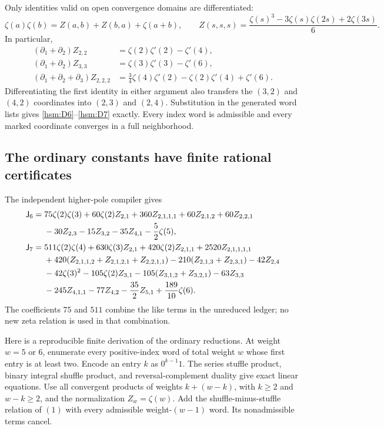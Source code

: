 Only identities valid on open convergence domains are differentiated:
\[
 \zeta(a)\zeta(b)=Z(a,b)+Z(b,a)+\zeta(a+b),\qquad
 Z(s,s,s)=\frac{\zeta(s)^3-3\zeta(s)\zeta(2s)+2\zeta(3s)}6.
\]
In particular,
\begin{align*}
 (\partial_1+\partial_2)Z_{2,2}
       &=\zeta(2)\zeta'(2)-\zeta'(4),\\
 (\partial_1+\partial_2)Z_{3,3}
       &=\zeta(3)\zeta'(3)-\zeta'(6),\\
 (\partial_1+\partial_2+\partial_3)Z_{2,2,2}
       &=\frac34\zeta(4)\zeta'(2)-\zeta(2)\zeta'(4)+\zeta'(6).
\end{align*}
Differentiating the first identity in either argument also transfers
the $(3,2)$ and $(4,2)$ coordinates into $(2,3)$ and $(2,4)$.
Substitution in the generated word lists gives
\eqref{hsm:D6}--\eqref{hsm:D7} exactly.  Every index word is
admissible and every marked coordinate converges in a full neighborhood.

\subsection{The ordinary constants have finite rational certificates}

The independent higher-pole compiler gives
\begin{align}\label{hsm:J6}
 \mathsf J_6={}&75\zeta(2)\zeta(3)+60\zeta(2)Z_{2,1}
       +360Z_{2,1,1,1}+60Z_{2,1,2}+60Z_{2,2,1}\notag\\
 &-30Z_{2,3}-15Z_{3,2}-35Z_{4,1}-\frac52\zeta(5),\\
 \mathsf J_7={}&511\zeta(2)\zeta(4)+630\zeta(3)Z_{2,1}
       +420\zeta(2)Z_{2,1,1}+2520Z_{2,1,1,1,1}\notag\\
 &+420(Z_{2,1,1,2}+Z_{2,1,2,1}+Z_{2,2,1,1})
       -210(Z_{2,1,3}+Z_{2,3,1})-42Z_{2,4}\notag\\
 &-42\zeta(3)^2-105\zeta(2)Z_{3,1}
       -105(Z_{3,1,2}+Z_{3,2,1})-63Z_{3,3}\notag\\
 &-245Z_{4,1,1}-77Z_{4,2}-\frac{35}{2}Z_{5,1}
       +\frac{189}{10}\zeta(6).
       \label{hsm:J7}
\end{align}
The coefficients $75$ and $511$ combine the like terms in the
unreduced ledger; no new zeta relation is used in that combination.

Here is a reproducible finite derivation of the ordinary reductions.
At weight $w=5$ or $6$, enumerate every positive-index word of total
weight $w$ whose first entry is at least two.  Encode an entry $k$
as $0^{k-1}1$.  The series stuffle product, binary integral shuffle
product, and reversal-complement duality give exact linear equations.
Use all convergent products of weights $k+(w-k)$, with $k\ge2$
and $w-k\ge2$, and the normalization $Z_w=\zeta(w)$.
Add the shuffle-minus-stuffle relation of $(1)$ with every admissible
weight-$(w-1)$ word.  Its nonadmissible terms cancel.

